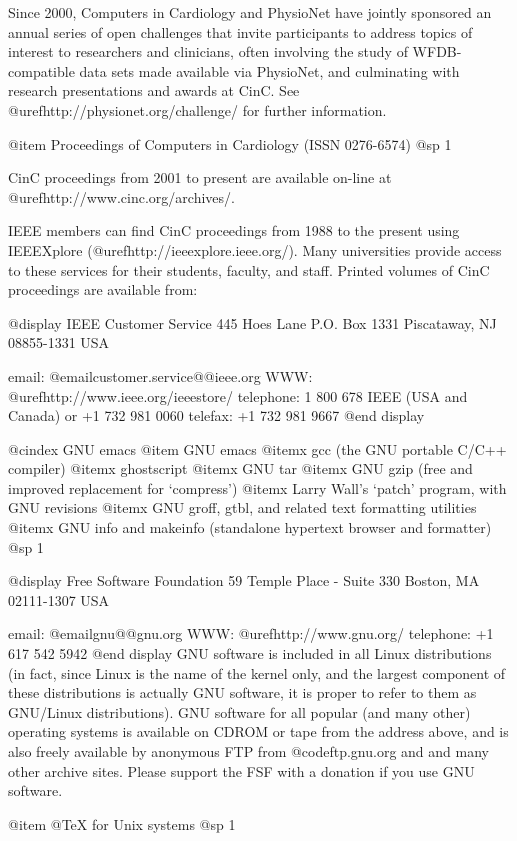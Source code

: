 {{{{{{{{Since 2000, Computers in Cardiology and PhysioNet have jointly sponsored
an annual series of open challenges that invite participants to address
topics of interest to researchers and clinicians, often involving the
study of WFDB-compatible data sets made available via PhysioNet, and
culminating with research presentations and awards at CinC.  See
@uref{http://physionet.org/challenge/} for further information.

@item Proceedings of Computers in Cardiology (ISSN 0276-6574)
@sp 1

CinC proceedings from 2001 to present are available on-line at
@uref{http://www.cinc.org/archives/}.

IEEE members can find CinC proceedings from 1988 to the
present using IEEEXplore (@uref{http://ieeexplore.ieee.org/}). Many
universities provide access to these services for their students, faculty, and
staff.  Printed volumes of CinC proceedings are available from:

@display
IEEE Customer Service
445 Hoes Lane
P.O. Box 1331
Piscataway, NJ 08855-1331 USA

email: @email{customer.service@@ieee.org}
WWW: @uref{http://www.ieee.org/ieeestore/}
telephone: 1 800 678 IEEE (USA and Canada) or +1 732 981 0060
telefax: +1 732 981 9667
@end display

@cindex GNU emacs
@item GNU emacs
@itemx gcc (the GNU portable C/C++ compiler)
@itemx ghostscript
@itemx GNU tar
@itemx GNU gzip (free and improved replacement for `compress')
@itemx Larry Wall's `patch' program, with GNU revisions
@itemx GNU groff, gtbl, and related text formatting utilities
@itemx GNU info and makeinfo (standalone hypertext browser and formatter)
@sp 1

@display
Free Software Foundation
59 Temple Place - Suite 330
Boston, MA 02111-1307 USA

email: @email{gnu@@gnu.org}
WWW: @uref{http://www.gnu.org/}
telephone: +1 617 542 5942
@end display
GNU software is included in all Linux distributions (in fact, since Linux
is the name of the kernel only, and the largest component of these
distributions is actually GNU software, it is proper to refer to them as
GNU/Linux distributions).  GNU software for all popular (and many other)
operating systems is available on CDROM or tape from the address above, and
is also freely available by anonymous FTP from @code{ftp.gnu.org} and and many
other archive sites.  Please support the FSF with a donation if you use GNU
software.

@item @TeX{} for Unix systems
@sp 1

}}}}}}}}
